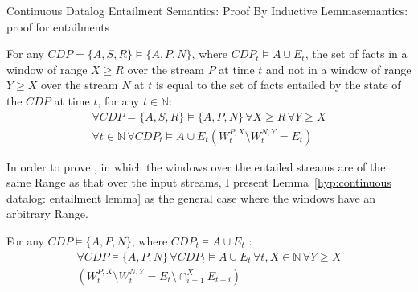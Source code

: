 \begin{nestedsection}{Continuous Datalog Entailment Semantics: Proof By Inductive Lemma}{semantics: proof for entailments}
	\begin{hyp}
		For any ${CDP = \{A,S,R\} \vDash \{A,P,N\}}$, where ${CDP_t \vDash A \cup E_t}$, the set of facts in a window of range ${X \geq R}$ over the stream $P$ at time $t$ and not in a window of range ${Y \geq X}$ over the stream $N$ at $t$ is equal to the set of facts entailed by the state of the ${CDP}$ at time $t$, for any ${t \in \mathbb{N}}$:
		\begin{multline*}
			\forall CDP = \{A,S,R\} \vDash \{A,P,N\} \, \forall X \geq R \, \forall Y \geq X \\
				\forall t \in \mathbb{N} \, \forall CDP_t \vDash A \cup E_t \left( W^{P,X}_t \setminus W^{N,Y}_t = E_t \right)
		\end{multline*}
	\end{hyp}
	In order to prove , in which the windows over the entailed streams are of the same Range as that over the input streams, I present Lemma~\ref{hyp:continuous datalog: entailment lemma} as the general case where the windows have an arbitrary Range.
	\begin{lem}\label{hyp:continuous datalog: entailment lemma}
		For any ${CDP \vDash \{A,P,N\}}$, where ${CDP_t \vDash A \cup E_t}$%
		:
		\begin{multline*}
			\forall CDP \vDash \{A,P,N\} \, \forall CDP_t \vDash A \cup E_t \, \forall t,X \in \mathbb{N} \, \forall Y \geq X \\
				\left( W^{P,X}_t \setminus W^{N,Y}_t = E_t \setminus \mathop{\cap}^{X}_{i=1} E_{t-i} \right)
		\end{multline*}
	\end{lem}


\end{nestedsection}
